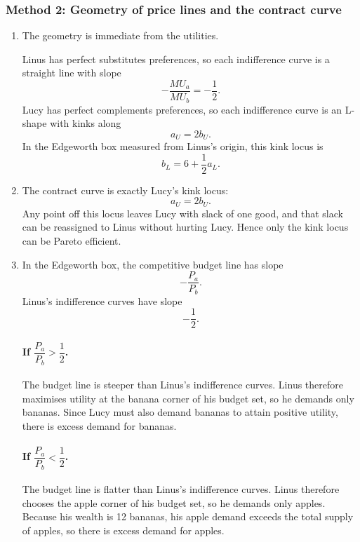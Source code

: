 \documentclass[12pt]{article}
\begin{document}
\newpage
\subsubsection{Method 2: Geometry of price lines and the contract curve}

\begin{enumerate}[label=(\alph*)]
    \item
    The geometry is immediate from the utilities.

    Linus has perfect substitutes preferences, so each indifference curve is a straight line with slope
    \[
    -\frac{MU_a}{MU_b}=-\frac{1}{2}.
    \]
    Lucy has perfect complements preferences, so each indifference curve is an L-shape with kinks along
    \[
    a_U=2b_U.
    \]
    In the Edgeworth box measured from Linus's origin, this kink locus is
    \[
    b_L=6+\frac12 a_L.
    \]

    \item
    The contract curve is exactly Lucy's kink locus:
    \[
    \boxed{a_U=2b_U.}
    \]
    Any point off this locus leaves Lucy with slack of one good, and that slack can be reassigned to Linus without hurting Lucy. Hence only the kink locus can be Pareto efficient.

    \item
    In the Edgeworth box, the competitive budget line has slope
    \[
    -\frac{P_a}{P_b}.
    \]
    Linus's indifference curves have slope
    \[
    -\frac12.
    \]

    \paragraph{If \(\dfrac{P_a}{P_b}>\dfrac12\).}
    The budget line is steeper than Linus's indifference curves. Linus therefore maximises utility at the banana corner of his budget set, so he demands only bananas. Since Lucy must also demand bananas to attain positive utility, there is excess demand for bananas.

    \paragraph{If \(\dfrac{P_a}{P_b}<\dfrac12\).}
    The budget line is flatter than Linus's indifference curves. Linus therefore chooses the apple corner of his budget set, so he demands only apples. Because his wealth is 12 bananas, his apple demand exceeds the total supply of apples, so there is excess demand for apples.


\end{enumerate}
\end{document}
